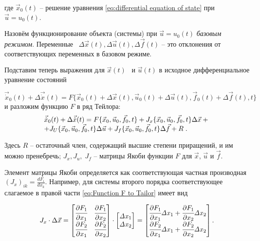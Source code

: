 		где  $\vec x_0(t)$ – решение уравнения  \eqref{eq:differential equation of state} %
		при  $\vec u=u_0(t)$.



		Назовём функционирование объекта (системы) при  $\vec u=u_0(t)$ \textit{базовым режимом}. Переменные \  $\Delta \vec
		x(t),\Delta \vec u(t),\Delta \vec f(t)$ – это отклонения от соответствующих переменных в базовом режиме.



		Подставим теперь выражения для  $\vec x(t)$ \ и  $\vec u(t)$ в исходное дифференциальное уравнение состояний


\begin{equation*}
\vec{\dot x}_0(t)+\Delta \vec{\dot x}(t)=F\{\vec x_0(t)+\Delta \vec x(t),\vec u_0(t)+\Delta \vec u(t),\vec f_0(t)+\Delta \vec f(t),t\}
\end{equation*}
		и разложим функцию  $F$ в ряд Тейлора:
\begin{equation}\label{eq:Function F to Tailor}
		\begin{matrix}\vec{\dot x}_0(t)+\Delta \vec{\dot x}(t)=F\{\vec x_0,\vec u_0,\vec f_0,t\}+J_x\{\vec
		x_0,\vec u_0,\vec f_0,t\}\Delta \vec x+\hfill\null \\+J_U\{\vec x_0,\vec u_0,\vec f_0,t\}\Delta \vec u+J_f\{\vec x_0,\vec u_0,\vec
		f_0,t\}\Delta \vec f+R\;.\hfill\null \end{matrix}  %
\end{equation}



		Здесь  $R$ – остаточный член, содержащий высшие степени приращений, и им можно пренебречь;  $J_x,J_u,\;J_f$ – матрицы
		Якоби функции  $F$ для  $\vec x$,  $\vec u$ и  $\vec f$.

		Элемент матрицы Якоби определяется как со­от­вет­ствующая частная производная 
		$ (J_{x})_{ik}=\frac{dF_{i}}{dx_{k}} $.
		Например, для системы второго порядка соответствующее слагаемое в правой части \eqref{eq:Function F to Tailor} %
		имеет вид
\bigskip

\begin{equation*}\label{key}
	J_x\cdot \Delta \vec x=\left[\begin{matrix}\cfrac{\partial F_1}{\partial x_1}&\cfrac{\partial F_1}{\partial
			x_2}\\\cfrac{\partial F_2}{\partial x_1}&\cfrac{\partial F_2}{\partial x_2}\end{matrix}\right]\cdot
		\left[\begin{matrix}\mathit{\Delta x}_1\\\mathit{\Delta x}_2\end{matrix}\right]=\left[\begin{matrix}\cfrac{\partial F_1}{\partial
			x_1}\mathit{\Delta x}_1+\cfrac{\partial F_1}{\partial x_2}\mathit{\Delta x}_2\\\cfrac{\partial F_2}{\partial
			x_1}\mathit{\Delta x}_1+\cfrac{\partial F_2}{\partial x_2}\mathit{\Delta x}_2\end{matrix}\right].
\end{equation*}



